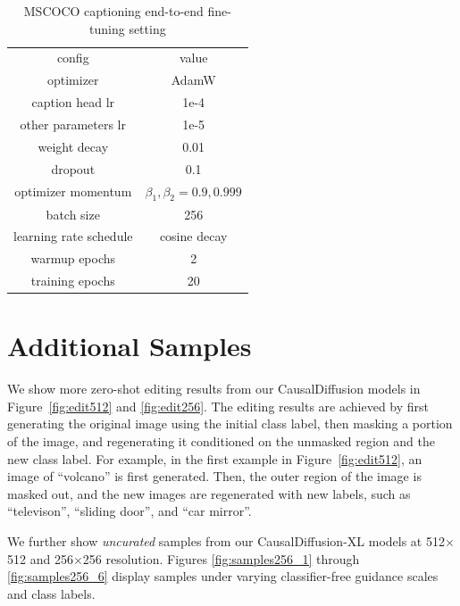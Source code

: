 \begin{table}[t]
    \footnotesize
    \begin{tabular}{c|c}
        config & value \\
        \shline
        optimizer & AdamW \\
        caption head lr   & 1e-4 \\
        other parameters lr  & 1e-5 \\
        weight decay & 0.01 \\
        dropout & 0.1 \\
        optimizer momentum & $\beta_1, \beta_2{=}0.9, 0.999$ \\
        batch size & 256 \\
        learning rate schedule & cosine decay \\
        warmup epochs & 2 \\
        training epochs & 20 \\
    \end{tabular}
    \caption{{MSCOCO captioning end-to-end fine-tuning setting}}
    \label{tab:msc_cap}
\end{table}


\section{Additional Samples}\label{appendix:secD}
\label{sec:model_sample}
We show more zero-shot editing results from our CausalDiffusion models in Figure~\ref{fig:edit512} and \ref{fig:edit256}.
The editing results are achieved by first generating the original image using the initial class label, then masking a portion of the image, and regenerating it conditioned on the unmasked region and the new class label.
For example, in the first example in Figure~\ref{fig:edit512}, an image of ``volcano'' is first generated. Then, the outer region of the image is masked out, and the new images are regenerated with new labels, such as ``televison'', ``sliding door'', and ``car mirror''.

We further show \textit{uncurated} samples from our CausalDiffusion-XL models at 512$\times$512 and 256$\times$256 resolution.
Figures \ref{fig:samples256_1} through \ref{fig:samples256_6} display samples under varying classifier-free guidance scales and class labels.


